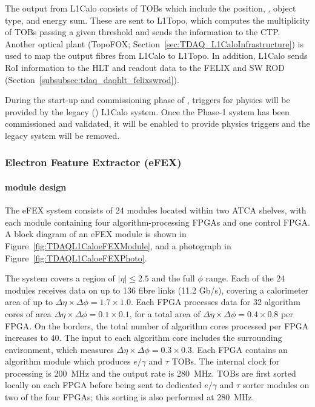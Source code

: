 \documentclass[cernpreprint, atlasdraft=false, UKenglish,british,orcidlogo, texmf, orcidlogo]{atlasdoc}
\begin{document}
The output from \gls{L1Calo} consists of \glspl{TOB} which include the position, \ET, object type, and energy sum.  These are sent to \gls{L1Topo}, which computes the multiplicity of \glspl{TOB} passing a given threshold and sends the information to the \gls{CTP}.  Another optical plant (TopoFOX; Section~\ref{sec:TDAQ_L1CaloInfrastructure}) is used to map the output fibres from \gls{L1Calo} to L1Topo.  In addition, \gls{L1Calo} sends \gls{RoI} information to the \gls{HLT} and readout data to the \gls{FELIX} and \gls{SW ROD} (Section~\ref{subsubsec:tdaq_daqhlt_felixswrod}).
 
During the start-up and commissioning phase of \RunThr, triggers for physics will be provided by the legacy (\RunOneTwo) \gls{L1Calo} system.  Once the Phase-1 system has been commissioned and validated, it will be enabled to provide physics triggers and the legacy system will be removed.
 
 
 
 
\subsubsection{Electron Feature Extractor (eFEX)}\label{sec:TDAQ_eFEX}
 
\paragraph{ module design}
The \gls{eFEX} system consists of 24 modules located within two \gls{ATCA} shelves, with each module containing four algorithm-processing \glspl{FPGA} and one control \gls{FPGA}.  A block diagram of an \gls{eFEX} module is shown in Figure~\ref{fig:TDAQL1CaloeFEXModule}, and a photograph in Figure~\ref{fig:TDAQL1CaloeFEXPhoto}.
 
The system covers a region of $|\eta|\le 2.5$ and the full $\phi$ range.  Each of the 24 modules receives data on up to 136 fibre links (11.2 Gb/s), covering a calorimeter area of up to $\Delta\eta\times\Delta\phi = 1.7 \times 1.0$.  Each \gls{FPGA} processes data for 32 algorithm cores of area 
$\Delta\eta\times\Delta\phi = 0.1\times 0.1$, for a total area of $\Delta\eta\times\Delta\phi = 0.4 \times 0.8$ per \gls{FPGA}.  On the borders, the total number of algorithm cores processed per \gls{FPGA} increases to 40.  The input to each algorithm core includes the surrounding environment, which measures $\Delta\eta\times\Delta\phi = 0.3 \times 0.3$.  Each \gls{FPGA} contains an algorithm module which produces $e/\gamma$ and $\tau$ \glspl{TOB}. The internal clock for processing is \SI{200}{\MHz} and the output rate is \SI{280}{\MHz}. \glspl{TOB} are first sorted locally on each \gls{FPGA} before being sent to dedicated $e/\gamma$ and $\tau$ sorter modules on two of the four \glspl{FPGA}; this sorting is also performed at \SI{280}{\MHz}.
 
\end{document}
